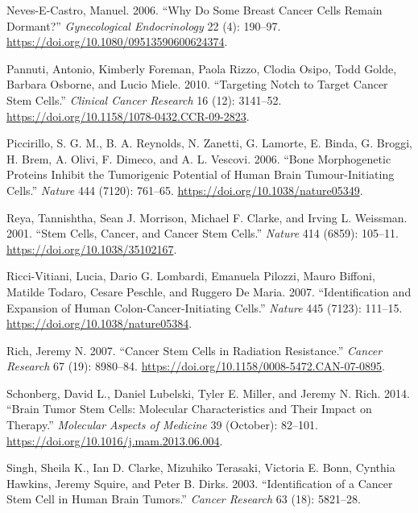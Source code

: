 \documentclass[
  letterpaper,
]{scrreprt}
\newlength{\cslhangindent}
\newenvironment{CSLReferences}[2] %
 {\begin{list}{}{%
  \setlength{\itemindent}{0pt}
  \setlength{\leftmargin}{0pt}
  \setlength{\parsep}{0pt}
  \ifodd #1
   \setlength{\leftmargin}{\cslhangindent}
   \setlength{\itemindent}{-1\cslhangindent}
  \fi
  \setlength{\itemsep}{#2\baselineskip}}}
 {\end{list}}
\theoremstyle{definition}
\theoremstyle{remark}
\begin{document}
\begin{CSLReferences}{1}{0}
Neves-E-Castro, Manuel. 2006. {``Why Do Some Breast Cancer Cells Remain
Dormant?''} \emph{Gynecological Endocrinology} 22 (4): 190--97.
\url{https://doi.org/10.1080/09513590600624374}.

Pannuti, Antonio, Kimberly Foreman, Paola Rizzo, Clodia Osipo, Todd
Golde, Barbara Osborne, and Lucio Miele. 2010. {``Targeting Notch to
Target Cancer Stem Cells.''} \emph{Clinical Cancer Research} 16 (12):
3141--52. \url{https://doi.org/10.1158/1078-0432.CCR-09-2823}.

Piccirillo, S. G. M., B. A. Reynolds, N. Zanetti, G. Lamorte, E. Binda,
G. Broggi, H. Brem, A. Olivi, F. Dimeco, and A. L. Vescovi. 2006.
{``Bone Morphogenetic Proteins Inhibit the Tumorigenic Potential of
Human Brain Tumour-Initiating Cells.''} \emph{Nature} 444 (7120):
761--65. \url{https://doi.org/10.1038/nature05349}.

Reya, Tannishtha, Sean J. Morrison, Michael F. Clarke, and Irving L.
Weissman. 2001. {``Stem Cells, Cancer, and Cancer Stem Cells.''}
\emph{Nature} 414 (6859): 105--11.
\url{https://doi.org/10.1038/35102167}.

Ricci-Vitiani, Lucia, Dario G. Lombardi, Emanuela Pilozzi, Mauro
Biffoni, Matilde Todaro, Cesare Peschle, and Ruggero De Maria. 2007.
{``Identification and Expansion of Human Colon-Cancer-Initiating
Cells.''} \emph{Nature} 445 (7123): 111--15.
\url{https://doi.org/10.1038/nature05384}.

Rich, Jeremy N. 2007. {``Cancer Stem Cells in Radiation Resistance.''}
\emph{Cancer Research} 67 (19): 8980--84.
\url{https://doi.org/10.1158/0008-5472.CAN-07-0895}.

Schonberg, David L., Daniel Lubelski, Tyler E. Miller, and Jeremy N.
Rich. 2014. {``Brain Tumor Stem Cells: Molecular Characteristics and
Their Impact on Therapy.''} \emph{Molecular Aspects of Medicine} 39
(October): 82--101. \url{https://doi.org/10.1016/j.mam.2013.06.004}.

Singh, Sheila K., Ian D. Clarke, Mizuhiko Terasaki, Victoria E. Bonn,
Cynthia Hawkins, Jeremy Squire, and Peter B. Dirks. 2003.
{``Identification of a Cancer Stem Cell in Human Brain Tumors.''}
\emph{Cancer Research} 63 (18): 5821--28.


\end{CSLReferences}
\end{document}
